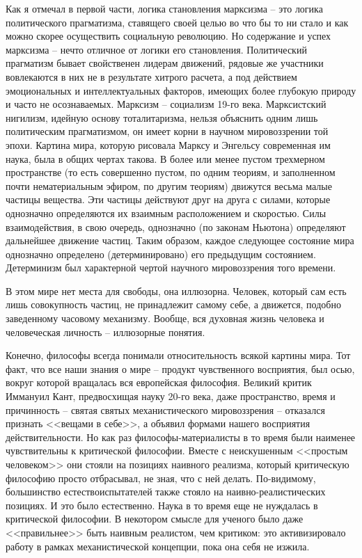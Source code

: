 \documentclass{book}
\begin{document}
Как я отмечал в первой части, логика становления марксизма -- это логика политического прагматизма, ставящего своей целью во что бы то ни стало и как можно скорее осуществить социальную революцию. Но содержание и успех марксизма -- нечто отличное от логики его становления. Политический прагматизм бывает свойственен лидерам движений, рядовые же участники вовлекаются в них не в результате хитрого расчета, а под действием эмоциональных и интеллектуальных факторов, имеющих более глубокую природу и часто не осознаваемых. Марксизм -- социализм 19-го века. Марксистский нигилизм, идейную основу тоталитаризма, нельзя объяснить одним лишь политическим прагматизмом, он имеет корни в научном мировоззрении той эпохи.
Картина мира, которую рисовала Марксу и Энгельсу совре­менная им наука, была в общих чертах такова. В более или менее пустом трехмерном пространстве (то есть совершенно пустом, по одним теориям, и заполненном почти нематериальным эфиром, по другим теориям) движутся весьма малые частицы вещества. Эти частицы действуют друг на друга с силами, кото­рые однозначно определяются их взаимным расположением и скоростью. Силы взаимодействия, в свою очередь, однознач­но (по законам Ньютона) определяют дальнейшее движение частиц. Таким образом, каждое следующее состояние мира однозначно определено (детерминировано) его предыдущим состоянием. Детерминизм был характерной чертой научного мировоззрения того времени.

В этом мире нет места для свободы, она иллюзорна. Человек, который сам есть лишь совокупность частиц, не принадлежит самому себе, а движется, подобно заведенному часовому меха­низму. Вообще, вся духовная жизнь человека и человеческая личность -- иллюзорные понятия.

Конечно, философы всегда понимали относительность вся­кой картины мира. Тот факт, что все наши знания о мире -- продукт чувственного восприятия, был осью, вокруг которой вращалась вся европейская философия. Великий критик Иммануил Кант, предвосхищая науку 20-го века, даже пространство, время и причинность -- святая святых механистического мировоззрения -- отказался признать <<вещами в себе>>, а объявил формами нашего восприятия действительности. Но как раз философы-материалисты в то время были наименее чувствительны к критической философии. Вместе с неискушенным <<простым человеком>> они стояли на позициях наивного реализма, который критическую философию просто отбрасывал, не зная, что с ней делать. По-видимому, большинство естествоиспытателей также стояло на наивно-реалистических позициях. И это было естественно. Наука в то время еще не нуждалась в критической философии. В некотором смысле для ученого было даже <<правильнее>> быть наивным реалистом, чем критиком: это активизировало работу в рамках 
механистической концепции, пока она себя не изжила.
\end{document}
